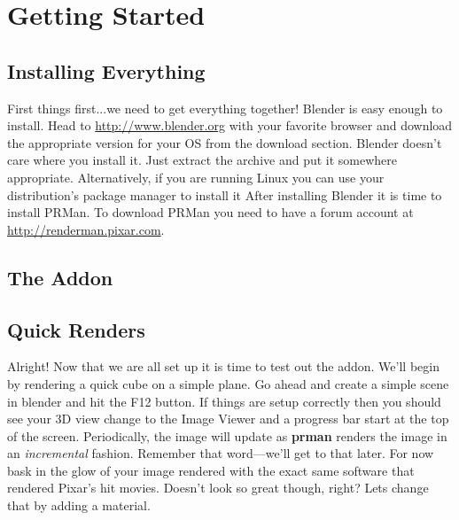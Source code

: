\chapter{Getting Started}  %
\section{Installing Everything}

First things first...we need to get everything together!
Blender is easy enough to install.  Head to \url{http://www.blender.org} with your favorite browser and download the appropriate version for your OS from the download section.  Blender doesn't care where you install it.  Just extract the archive and put it somewhere appropriate.  Alternatively, if you are running Linux you can use your distribution's package manager to install it
After installing Blender it is time to install PRMan.  To download PRMan you need to have a forum account at \url{http://renderman.pixar.com}.
\section{The Addon}
\section{Quick Renders}

Alright!  Now that we are all set up it is time to test out the addon.  We'll begin by rendering a quick cube on a simple plane.  Go ahead and create a simple scene in blender and hit the \textsf{F12} button.  
If things are setup correctly then you should see your 3D view change to the Image Viewer and a progress bar start at the top of the screen.  Periodically, the image will update as \textbf{prman} renders the image in an \emph{incremental} fashion.  Remember that word---we'll get to that later.  For now bask in the glow of your image rendered with the exact same software that rendered Pixar's hit movies.  Doesn't look so great though, right?  Lets change that by adding a material.

